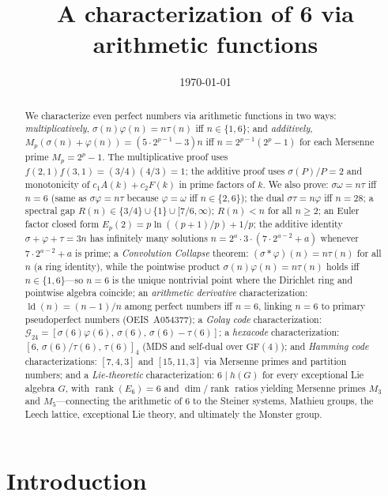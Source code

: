 \documentclass[11pt]{amsart}
\title{A characterization of 6 via arithmetic functions}
\author{}
\date{\today}
\theoremstyle{remark}
\begin{document}
\maketitle

\begin{abstract}
We characterize even perfect numbers via arithmetic functions in two ways:
\emph{multiplicatively}, $\sigma(n)\varphi(n) = n\tau(n)$ iff $n \in \{1,6\}$;
and \emph{additively}, $M_p(\sigma(n)+\varphi(n)) = (5 \cdot 2^{p-1}-3)n$
iff $n = 2^{p-1}(2^p-1)$ for each Mersenne prime $M_p = 2^p - 1$.
The multiplicative proof uses $f(2,1) f(3,1) = (3/4)(4/3) = 1$;
the additive proof uses $\sigma(P)/P = 2$ and monotonicity of
$c_1 A(k) + c_2 F(k)$ in prime factors of $k$.
We also prove: $\sigma\omega = n\tau$ iff $n=6$ (same as $\sigma\varphi = n\tau$
because $\varphi = \omega$ iff $n \in \{2,6\}$);
the dual $\sigma\tau = n\varphi$ iff $n = 28$;
a spectral gap $R(n) \in \{3/4\} \cup \{1\} \cup [7/6,\infty)$;
$R(n) < n$ for all $n \geq 2$;
an Euler factor closed form $E_p(2) = p\ln((p+1)/p) + 1/p$;
the additive identity $\sigma + \varphi + \tau = 3n$
has infinitely many solutions $n = 2^a \cdot 3 \cdot (7 \cdot 2^{a-2} + a)$
whenever $7 \cdot 2^{a-2} + a$ is prime;
a \emph{Convolution Collapse} theorem:
$(\sigma * \varphi)(n) = n\tau(n)$ for all $n$ (a ring identity),
while the pointwise product $\sigma(n)\varphi(n) = n\tau(n)$
holds iff $n \in \{1,6\}$---so $n = 6$ is the unique nontrivial point
where the Dirichlet ring and pointwise algebra coincide;
an \emph{arithmetic derivative} characterization:
$\operatorname{ld}(n) = (n-1)/n$ among perfect numbers iff $n = 6$,
linking $n = 6$ to primary pseudoperfect numbers (OEIS~A054377);
a \emph{Golay code} characterization:
$\mathcal{G}_{24} = [\sigma(6)\varphi(6),\, \sigma(6),\, \sigma(6)-\tau(6)]$;
a \emph{hexacode} characterization:
$[6,\,\sigma(6)/\tau(6),\,\tau(6)]_4$ (MDS and self-dual over $\mathrm{GF}(4)$);
and \emph{Hamming code} characterizations:
$[7,4,3]$ and $[15,11,3]$ via Mersenne primes and partition numbers;
and a \emph{Lie-theoretic} characterization:
$6 \mid h(G)$ for every exceptional Lie algebra $G$,
with $\operatorname{rank}(E_6) = 6$ and $\dim/\operatorname{rank}$
ratios yielding Mersenne primes $M_3$ and $M_5$---connecting
the arithmetic of $6$ to the Steiner systems, Mathieu groups,
the Leech lattice, exceptional Lie theory, and ultimately the Monster group.
\end{abstract}

\section{Introduction}
\end{document}
